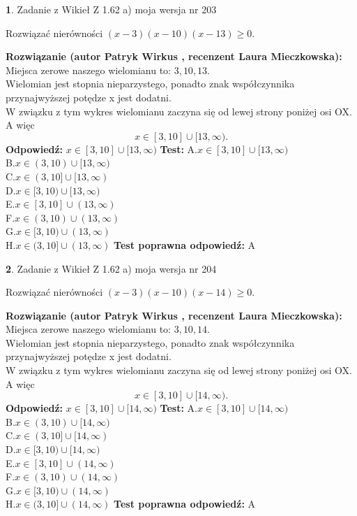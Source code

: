 \documentclass[12pt, a4paper]{article}
\theoremstyle{definition} %
\newtheorem{zad}{}
\newcommand{\zadStart}[1]{\begin{zad}#1\newline}
\newcommand{\zadStop}{\end{zad}}
\newcommand{\rozwStart}[2]{\noindent \textbf{Rozwiązanie (autor #1 , recenzent #2): }\newline}
\newcommand{\rozwStop}{\newline}
\newcommand{\odpStart}{\noindent \textbf{Odpowiedź:}\newline}
\newcommand{\odpStop}{\newline}
\newcommand{\testStart}{\noindent \textbf{Test:}\newline}
\newcommand{\testStop}{\newline}
\newcommand{\kluczStart}{\noindent \textbf{Test poprawna odpowiedź:}\newline}
\newcommand{\kluczStop}{\newline}
\begin{document}
\zadStart{Zadanie z Wikieł Z 1.62 a) moja wersja nr 203}

Rozwiązać nierówności $(x-3)(x-10)(x-13)\ge0$.
\zadStop
\rozwStart{Patryk Wirkus}{Laura Mieczkowska}
Miejsca zerowe naszego wielomianu to: $3, 10, 13$.\\
Wielomian jest stopnia nieparzystego, ponadto znak współczynnika przy\linebreak najwyższej potędze x jest dodatni.\\ W związku z tym wykres wielomianu zaczyna się od lewej strony poniżej osi OX. A więc $$x \in [3,10] \cup [13,\infty).$$
\rozwStop
\odpStart
$x \in [3,10] \cup [13,\infty)$
\odpStop
\testStart
A.$x \in [3,10] \cup [13,\infty)$\\
B.$x \in (3,10) \cup [13,\infty)$\\
C.$x \in (3,10] \cup [13,\infty)$\\
D.$x \in [3,10) \cup [13,\infty)$\\
E.$x \in [3,10] \cup (13,\infty)$\\
F.$x \in (3,10) \cup (13,\infty)$\\
G.$x \in [3,10) \cup (13,\infty)$\\
H.$x \in (3,10] \cup (13,\infty)$
\testStop
\kluczStart
A
\kluczStop



\zadStart{Zadanie z Wikieł Z 1.62 a) moja wersja nr 204}

Rozwiązać nierówności $(x-3)(x-10)(x-14)\ge0$.
\zadStop
\rozwStart{Patryk Wirkus}{Laura Mieczkowska}
Miejsca zerowe naszego wielomianu to: $3, 10, 14$.\\
Wielomian jest stopnia nieparzystego, ponadto znak współczynnika przy\linebreak najwyższej potędze x jest dodatni.\\ W związku z tym wykres wielomianu zaczyna się od lewej strony poniżej osi OX. A więc $$x \in [3,10] \cup [14,\infty).$$
\rozwStop
\odpStart
$x \in [3,10] \cup [14,\infty)$
\odpStop
\testStart
A.$x \in [3,10] \cup [14,\infty)$\\
B.$x \in (3,10) \cup [14,\infty)$\\
C.$x \in (3,10] \cup [14,\infty)$\\
D.$x \in [3,10) \cup [14,\infty)$\\
E.$x \in [3,10] \cup (14,\infty)$\\
F.$x \in (3,10) \cup (14,\infty)$\\
G.$x \in [3,10) \cup (14,\infty)$\\
H.$x \in (3,10] \cup (14,\infty)$
\testStop
\kluczStart
A
\kluczStop
\end{document}
